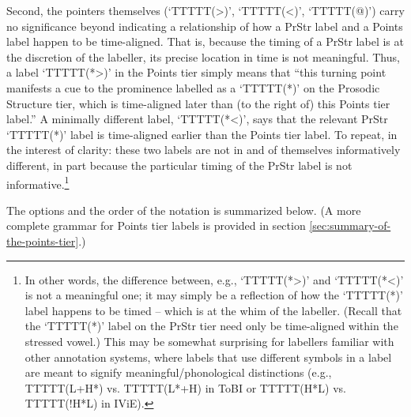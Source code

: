 \documentclass[11pt, twoside]{memoir}
\begin{document}
Second, the pointers themselves (‘TTTTT(>)’, ‘TTTTT(<)’, ‘TTTTT(@)’) carry no significance beyond indicating a relationship of how a PrStr label and a Points label happen to be time-aligned. That is, because the timing of a PrStr label is at the discretion of the labeller, its precise location in time is not meaningful.  Thus, a label ‘TTTTT(*>)’ in the Points tier simply means that “this turning point manifests a cue to the prominence labelled as a ‘TTTTT(*)’ on the Prosodic Structure tier, which is time-aligned later than (to the right of) this Points tier label.” A minimally different label, ‘TTTTT(*<)’, says that the relevant PrStr ‘TTTTT(*)’ label is time-aligned earlier than the Points tier label. To repeat, in the interest of clarity: these two labels are not in and of themselves informatively different, in part because the particular timing of the PrStr label is not informative.\footnote{In other words, the difference between, e.g., ‘TTTTT(*>)’ and ‘TTTTT(*<)’ is not a meaningful one; it may simply be a reflection of how the ‘TTTTT(*)’ label happens to be timed – which is at the whim of the labeller. (Recall that the ‘TTTTT(*)’ label on the PrStr tier need only be time-aligned within the stressed vowel.) This may be somewhat surprising for labellers familiar with other annotation systems, where labels that use different symbols in a label are meant to signify meaningful\slash phonological distinctions (e.g., TTTTT(L+H*) vs. TTTTT(L*+H) in ToBI or TTTTT(H*L) vs. TTTTT(!H*L) in IViE).}

The options and the order of the notation is summarized below. (A more complete grammar for Points tier labels is provided in section \ref{sec:summary-of-the-points-tier}.)
\end{document}
